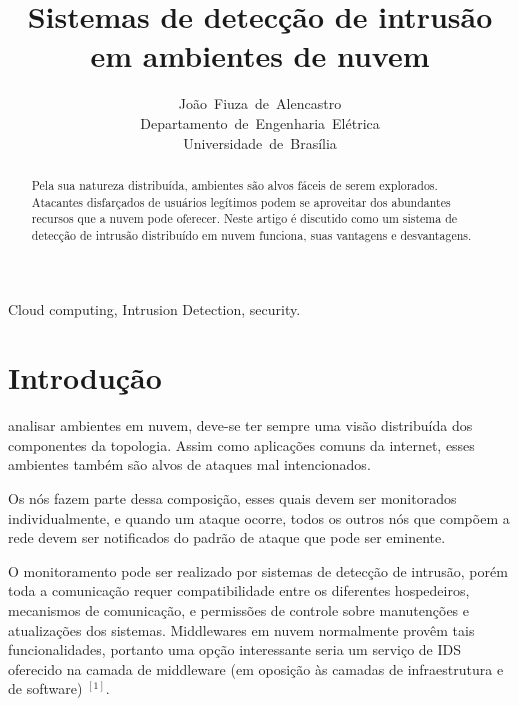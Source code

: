 \documentclass[journal]{IEEEtran}
\begin{document}
\title{Sistemas de detecção de intrusão\\ em ambientes de nuvem}


\author{João~Fiuza~de~Alencastro\\Departamento~de~Engenharia~Elétrica\\Universidade~de~Brasília}%




\maketitle


\begin{abstract}
Pela sua natureza distribuída, ambientes são alvos fáceis de serem explorados. Atacantes disfarçados de usuários legítimos podem se aproveitar dos abundantes recursos que a nuvem pode oferecer. Neste artigo é discutido como um sistema de detecção de intrusão distribuído em nuvem funciona, suas vantagens e desvantagens.%
\end{abstract}

\begin{IEEEkeywords}
Cloud computing, Intrusion Detection, security.
\end{IEEEkeywords}


\IEEEpeerreviewmaketitle



\section{Introdução}
 analisar ambientes em nuvem, deve-se ter sempre uma visão distribuída dos componentes da topologia. Assim como aplicações comuns da internet, esses ambientes também são alvos de ataques mal intencionados. \par
Os nós fazem parte dessa composição, esses quais devem ser monitorados individualmente, e quando um ataque ocorre, todos os outros nós que compõem a rede devem ser notificados do padrão de ataque que pode ser eminente. \par
O monitoramento pode ser realizado por sistemas de detecção de intrusão, porém toda a comunicação requer compatibilidade entre os diferentes hospedeiros, mecanismos de comunicação, e permissões de controle sobre manutenções e atualizações dos sistemas. Middlewares em nuvem normalmente provêm tais funcionalidades, portanto uma opção interessante seria um serviço de IDS oferecido na camada de middleware (em oposição às camadas de infraestrutura e de software) $^{ [1] }$.
\end{document}
